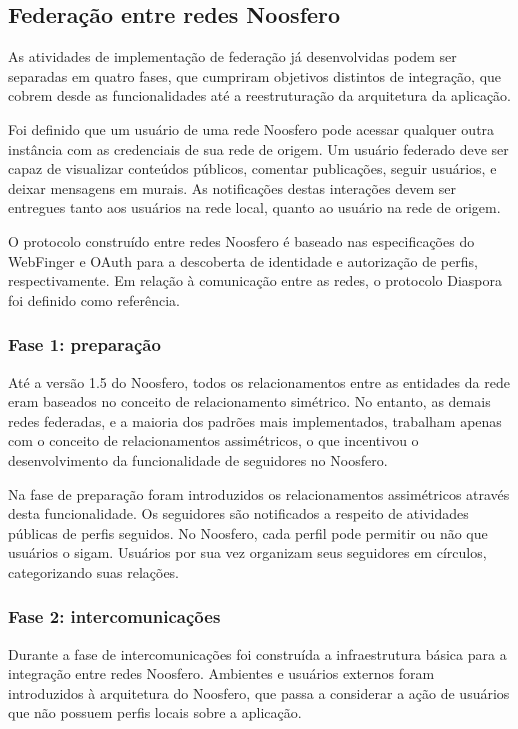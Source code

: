 \subsection{Federação entre redes Noosfero}
\label{subsec:federacao_noosfero}

As atividades de implementação de federação já desenvolvidas podem ser separadas em
quatro fases, que cumpriram objetivos distintos de integração, que cobrem desde as
funcionalidades até a reestruturação da arquitetura da aplicação.

Foi definido que um usuário de uma rede Noosfero pode acessar qualquer outra
instância com as credenciais de sua rede de origem. Um usuário federado deve ser
capaz de visualizar conteúdos públicos, comentar publicações, seguir usuários, e
deixar mensagens em murais. As notificações destas interações devem ser entregues
tanto aos usuários na rede local, quanto ao usuário na rede de origem.

O protocolo construído entre redes Noosfero é baseado nas especificações do
WebFinger e OAuth para a descoberta de identidade e autorização de perfis,
respectivamente. Em relação à comunicação entre as redes, o protocolo Diaspora foi
definido como referência. 

\subsubsection{Fase 1: preparação}

Até a versão 1.5 do Noosfero, todos os relacionamentos entre as entidades da rede
eram baseados no conceito de relacionamento simétrico. No entanto, as demais redes
federadas, e a maioria dos padrões mais implementados, trabalham apenas com o
conceito de relacionamentos assimétricos, o que incentivou o desenvolvimento da
funcionalidade de seguidores no Noosfero.

Na fase de preparação foram introduzidos os relacionamentos assimétricos através
desta funcionalidade. Os seguidores são notificados a respeito de atividades
públicas de perfis seguidos. No Noosfero, cada perfil pode permitir ou não que
usuários o sigam. Usuários por sua vez organizam seus seguidores em círculos,
categorizando suas relações.

\subsubsection{Fase 2: intercomunicações}

Durante a fase de intercomunicações foi construída a infraestrutura básica para a
integração entre redes Noosfero. Ambientes e usuários externos foram introduzidos à
arquitetura do Noosfero, que passa a considerar a ação de usuários que não possuem
perfis locais sobre a aplicação.

